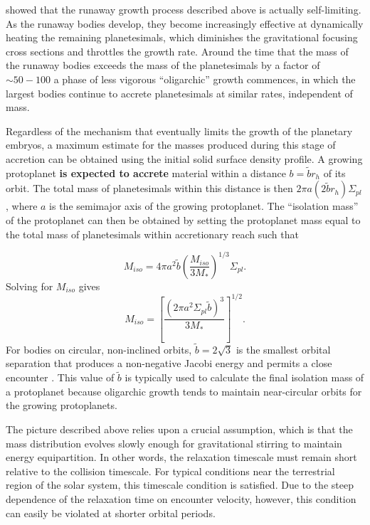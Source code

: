 \documentclass[twocolumn,linenumbers]{aastex63}
\begin{document}
\citet{kokubo98} showed that the runaway growth process described above is actually self-limiting. As the runaway
bodies develop, they become increasingly effective at dynamically heating the
remaining planetesimals, which diminishes the
gravitational focusing cross sections and throttles the growth rate. Around the time
that the mass of the runaway bodies exceeds the mass of the planetesimals
by a factor of $\sim 50-100$
\citep{ida93} a phase of less vigorous ``oligarchic'' 
growth commences, in which the largest bodies continue to 
accrete planetesimals at similar rates, independent of mass.

Regardless of the mechanism that eventually limits the growth of the planetary embryos, a maximum estimate for the masses produced during this 
stage of accretion can be obtained using the initial solid surface density profile. A growing protoplanet \textbf{is expected to accrete} material within a distance
$b = \tilde{b} r_{h}$ of its orbit. The total mass of planetesimals
within this distance is then $2 \pi a \left(2 \tilde{b} r_{h} \right)
\Sigma_{pl}$, where $a$ is the semimajor axis of the growing protoplanet. The ``isolation mass'' of the protoplanet can then be obtained by setting the protoplanet mass equal to the total mass of planetesimals within accretionary reach such that

\begin{equation}\label{eq:iso_mass1}
	M_{iso} = 4 \pi a^{2} \tilde{b} \left(\frac{M_{iso}}{3 M_{*}} \right)^{1/3} \Sigma_{pl}.
\end{equation}
\noindent Solving for $M_{iso}$ gives
\begin{equation}\label{eq:iso}
	M_{iso} = \left[ \frac{\left( 2 \pi a^2 \Sigma_{pl} \tilde{b} \right)^3}{3 M_{*}} \right]^{1/2}.
\end{equation}
\noindent For bodies on circular, non-inclined orbits, $\tilde{b} = 2 \sqrt{3}$ is the smallest orbital separation that produces a non-negative
Jacobi energy and permits a close encounter \citep{naka88}. This value of $\tilde{b}$ is typically used to calculate the final isolation mass of a protoplanet because oligarchic growth tends to maintain near-circular orbits for the growing protoplanets.

The picture described above relies upon a crucial assumption, which
is that the mass distribution evolves slowly enough for gravitational stirring to maintain energy equipartition. In other words, the relaxation timescale must remain short relative to the collision timescale. For typical conditions near the terrestrial region of the solar system, this timescale condition is satisfied. Due to the steep dependence of the relaxation time on encounter velocity, however, this condition can easily be violated at shorter orbital periods.
\end{document}

